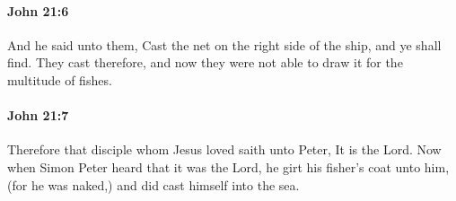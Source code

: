 		\paragraph{John 21:6} %
			\label{JOHN-21-6}

			And he said unto them, Cast the net on the right side of the ship, and ye shall find. They cast therefore, and now they were not able to draw it for the multitude of fishes.

			\begin{framed}
				\scriptsize
				\begin{compactdesc}
					\item[SBLG] 
				\end{compactdesc}
			\end{framed}

		\paragraph{John 21:7} %
			\label{JOHN-21-7}

			Therefore that disciple whom Jesus loved saith unto Peter, It is the Lord. Now when Simon Peter heard that it was the Lord, he girt his fisher's coat unto him, (for he was naked,) and did cast himself into the sea.

